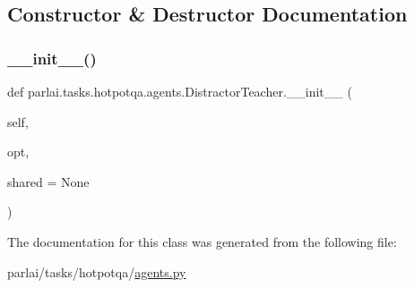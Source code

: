 \subsection{Constructor \& Destructor Documentation}
\mbox{\label{classparlai_1_1tasks_1_1hotpotqa_1_1agents_1_1DistractorTeacher_a933e9ee4fe9a8557477562a9a05d598c}} 
\subsubsection{\texorpdfstring{\+\_\+\+\_\+init\+\_\+\+\_\+()}{\_\_init\_\_()}}
{\footnotesize\ttfamily def parlai.\+tasks.\+hotpotqa.\+agents.\+Distractor\+Teacher.\+\_\+\+\_\+init\+\_\+\+\_\+ (\begin{DoxyParamCaption}\item[{}]{self,  }\item[{}]{opt,  }\item[{}]{shared = {\ttfamily None} }\end{DoxyParamCaption})}



The documentation for this class was generated from the following file\+:\begin{DoxyCompactItemize}
\item 
parlai/tasks/hotpotqa/\hyperlink{parlai_2tasks_2hotpotqa_2agents_8py}{agents.\+py}\end{DoxyCompactItemize}
